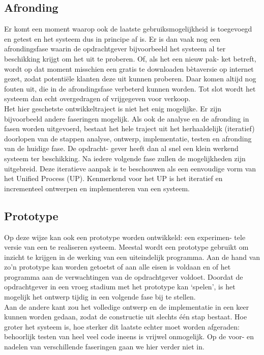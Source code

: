 \documentclass{article}
\begin{document}
	\subsection{Afronding}
	
	Er komt een moment waarop ook de laatste gebruiksmogelijkheid is
	toegevoegd en getest en het systeem dus in principe af is. Er is dan vaak
	nog een afrondingsfase waarin de opdrachtgever bijvoorbeeld het systeem
	al ter beschikking krijgt om het uit te proberen. Of, als het een nieuw pak-
	ket betreft, wordt op dat moment misschien een gratis te downloaden
	bètaversie op internet gezet, zodat potentiële klanten deze uit kunnen
	proberen. Daar komen altijd nog fouten uit, die in de afrondingsfase
	verbeterd kunnen worden. Tot slot wordt het systeem dan echt overgedragen of vrijgegeven voor verkoop. \\
	Het hier geschetste ontwikkeltraject is niet het enig mogelijke. Er zijn
	bijvoorbeeld andere faseringen mogelijk. Als ook de analyse en de
	afronding in fasen worden uitgevoerd, bestaat het hele traject uit het
	herhaaldelijk (iteratief) doorlopen van de stappen analyse, ontwerp,
	implementatie, testen en afronding van de huidige fase. De opdracht-
	gever heeft dan al snel een klein werkend systeem ter beschikking.
	Na iedere volgende fase zullen de mogelijkheden zijn uitgebreid.
	Deze iteratieve aanpak is te beschouwen als een eenvoudige vorm van
	het Unified Process (UP). Kenmerkend voor het UP is het iteratief en
	incrementeel ontwerpen en implementeren van een systeem.
	
	\subsection{Prototype}
	
	Op deze wijze kan ook een prototype worden ontwikkeld: een experimen-
	tele versie van een te realiseren systeem. Meestal wordt een prototype
	gebruikt om inzicht te krijgen in de werking van een uiteindelijk programma. Aan de hand van zo’n prototype kan worden getoetst of aan
	alle eisen is voldaan en of het programma aan de verwachtingen van de
	opdrachtgever voldoet. Doordat de opdrachtgever in een vroeg stadium
	met het prototype kan ‘spelen’, is het mogelijk het ontwerp tijdig in een
	volgende fase bij te stellen. \\
	
	Aan de andere kant zou het volledige ontwerp en de implementatie in
	een keer kunnen worden gedaan, zodat de constructie uit slechts één
	stap bestaat. Hoe groter het systeem is, hoe sterker dit laatste echter moet
	worden afgeraden: behoorlijk testen van heel veel code ineens is vrijwel
	onmogelijk. Op de voor- en nadelen van verschillende faseringen gaan
	we hier verder niet in. \\
	
\end{document}
